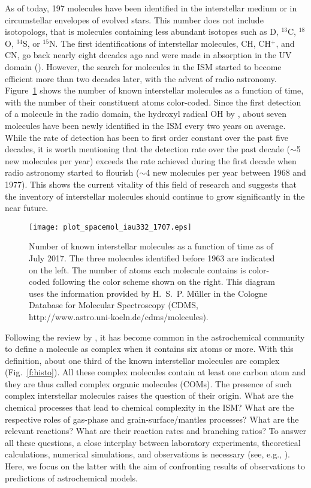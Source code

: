 \documentclass{iau}
\begin{document}
As of today, 197 molecules have been identified in the interstellar medium or 
in circumstellar envelopes of evolved stars. This number does not include 
isotopologs, that is molecules containing less abundant isotopes such as
D, $^{13}$C, $^{18}$O, $^{34}$S, or $^{15}$N. The first identifications of 
interstellar molecules, CH, CH$^+$, and CN, go back nearly 
eight decades ago and were made in absorption in the UV domain 
(\cite{McKellar40,Adams41,Douglas41}). However, the search for molecules in 
the ISM started to become efficient more than two decades later, with the 
advent of radio astronomy. Figure~\ref{f:spacemol} shows the number of known 
interstellar molecules as a function of time, with the number of their 
constituent atoms color-coded. Since the first detection of a molecule in the 
radio domain, the hydroxyl radical OH by \cite{Weinreb63}, about seven 
molecules have been newly identified in the ISM every two years on average.
While the rate of detection has been to first order constant over the past 
five decades, it is worth mentioning that the detection rate over the past 
decade ($\sim$5 new molecules per year) exceeds the rate achieved during the 
first decade when radio astronomy started to flourish ($\sim$4 new molecules 
per year between 1968 and 1977). This shows the current vitality of this field 
of research and suggests that the inventory of interstellar molecules should 
continue to grow significantly in the near future.

\begin{figure}
\begin{center}
\texttt{[image: plot\_spacemol\_iau332\_1707.eps]}
\end{center}
\caption{Number of known interstellar molecules as a function of time as of
July 2017. The three molecules identified before 1963 are 
indicated on the left. The number of atoms each molecule contains is 
color-coded following the color scheme shown on the right. This diagram uses
the information provided by H.~S.~P. M\"uller in the Cologne Database for 
Molecular Spectroscopy (CDMS, http://www.astro.uni-koeln.de/cdms/molecules).}
\label{f:spacemol}
\end{figure}

Following the review by \cite{Herbst09}, it has become common in the 
astrochemical community to define a molecule as complex when it contains six 
atoms or more. With this definition, about one third of the known interstellar
molecules are complex
(Fig.~\ref{f:histo}). All these complex molecules contain at least one carbon 
atom and they are thus called complex organic molecules (COMs). The presence 
of such complex interstellar molecules raises the question of their origin. 
What are the chemical processes that lead to chemical complexity in the ISM? 
What are the respective roles of gas-phase and grain-surface/mantles 
processes? What are the relevant reactions? What are their reaction rates and
branching ratios? To answer all these questions, a close interplay between 
laboratory experiments, theoretical calculations, numerical simulations, and 
observations is necessary (see, e.g., \cite{Herbst09,Garrod13b,Oberg16}). Here, 
we focus on the latter with the aim of confronting results of observations to 
predictions of astrochemical models.
\end{document}
